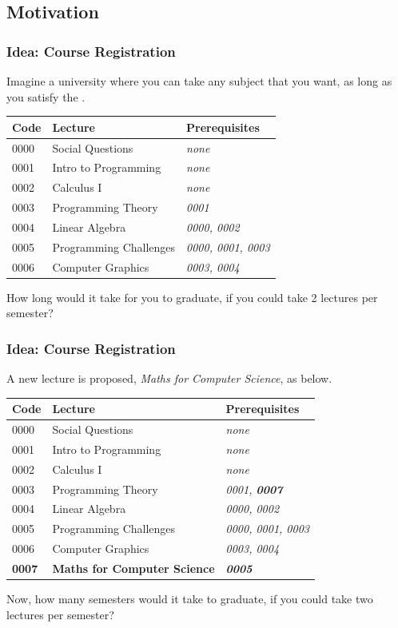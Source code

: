 \documentclass{beamer}
\begin{document}
\subsection{Motivation}

\begin{frame}
  \frametitle{Idea: Course Registration}
  Imagine a university where you can take any subject that you want,
  as long as you satisfy the .
  \bigskip

  \begin{tabular}{p{}|p{}||p{}}
    \hline
    Code & Lecture & Prerequisites \\
    \hline
    0000 & {\small Social Questions} & \emph{none} \\
    0001 & {\small Intro to Programming} & \emph{none} \\
    0002 & {\small Calculus I} & \emph{none} \\
    0003 & {\small Programming Theory} & \emph{0001} \\
    0004 & {\small Linear Algebra} & \emph{0000, 0002} \\
    0005 & {\small Programming Challenges} & \emph{0000, 0001, 0003} \\
    0006 & {\small Computer Graphics} & \emph{0003, 0004} \\
    \hline
  \end{tabular}
  \bigskip

  How long would it take for you to graduate, if you could take 2 lectures
  per semester?
\end{frame}

\begin{frame}
  \frametitle{Idea: Course Registration}
  A new lecture is proposed, \emph{Maths for Computer Science}, as
  below.

  \bigskip

  \begin{tabular}{p{}|p{}||p{}}
    \hline
    Code & Lecture & Prerequisites \\
    \hline
    0000 & {\small Social Questions} & \emph{none} \\
    0001 & {\small Intro to Programming} & \emph{none} \\
    0002 & {\small Calculus I} & \emph{none} \\
    0003 & {\small Programming Theory} & \emph{0001, {\bf 0007}} \\
    0004 & {\small Linear Algebra} & \emph{0000, 0002} \\
    0005 & {\small Programming Challenges} & \emph{0000, 0001, 0003} \\
    0006 & {\small Computer Graphics} & \emph{0003, 0004} \\
    {\bf 0007} & {\small {\bf Maths for Computer Science}} & {\bf\emph{0005}} \\
    \hline
  \end{tabular}
  \bigskip

  Now, how many semesters would it take to graduate, if you could
 take two lectures per semester?
\end{frame}
\end{document}
